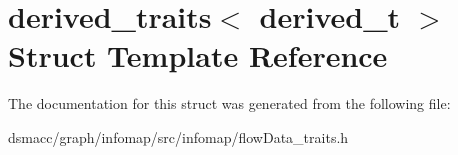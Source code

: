 \hypertarget{structderived__traits}{}\section{derived\+\_\+traits$<$ derived\+\_\+t $>$ Struct Template Reference}
\label{structderived__traits}


The documentation for this struct was generated from the following file\+:\begin{DoxyCompactItemize}
\item 
dsmacc/graph/infomap/src/infomap/flow\+Data\+\_\+traits.\+h\end{DoxyCompactItemize}

